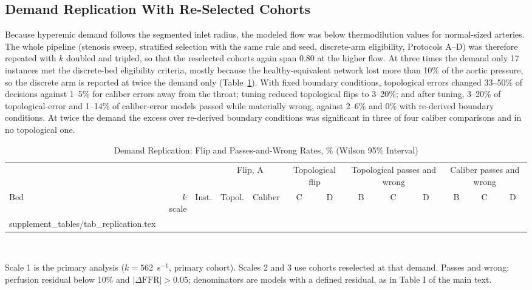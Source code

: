 \documentclass[journal,twoside,web,onecolumn]{ieeecolor}
\begin{document}
\subsection{Demand Replication With Re-Selected Cohorts}\label{sec:replication}
Because hyperemic demand follows the segmented inlet radius, the modeled flow was below thermodilution values for
normal-sized arteries. The whole pipeline (stenosis sweep, stratified selection with the same rule and seed,
discrete-arm eligibility, Protocols A--D) was therefore repeated with $k$ doubled and tripled, so that the reselected
cohorts again span 0.80 at the higher flow. At three times the demand only 17 instances met the discrete-bed
eligibility criteria, mostly because the healthy-equivalent network lost more than 10\% of the aortic pressure, so the
discrete arm is reported at twice the demand only (Table~\ref{tab:repl}). With fixed boundary conditions, topological errors changed 33--50\% of decisions against 1--5\% for caliber errors away from the throat; tuning reduced topological flips to 3--20\%; and after tuning, 3--20\% of topological-error and 1--14\% of caliber-error models passed while materially wrong, against 2--6\% and 0\% with re-derived boundary conditions. At twice the demand the excess over re-derived boundary conditions was significant in three of four caliber comparisons and in no topological one.
\begin{table}[!ht]
\caption{Demand Replication: Flip and Passes-and-Wrong Rates, \% (Wilson 95\% Interval)}\label{tab:repl}
\centering\footnotesize\setlength{\tabcolsep}{3pt}
\begin{tabular}{@{}lrrcccccccccc@{}}
\toprule
 & & & \multicolumn{2}{c}{Flip, A} & \multicolumn{2}{c}{Topological flip} & \multicolumn{3}{c}{Topological passes and wrong} & \multicolumn{3}{c}{Caliber passes and wrong}\\
\cmidrule(lr){4-5}\cmidrule(lr){6-7}\cmidrule(lr){8-10}\cmidrule(l){11-13}
Bed & $k$ scale & Inst. & Topol. & Caliber & C & D & B & C & D & B & C & D\\
\midrule
{} supplement_tables/tab_replication.tex 
\bottomrule
\end{tabular}
\\[3pt]
\parbox{0.95\textwidth}{\footnotesize Scale 1 is the primary analysis ($k = 562$~s$^{-1}$, primary cohort). Scales 2 and 3 use
cohorts reselected at that demand. Passes and wrong: perfusion residual below 10\% and $|\Delta\mathrm{FFR}| > 0.05$;
denominators are models with a defined residual, as in Table I of the main text.}
\end{table}
\end{document}
